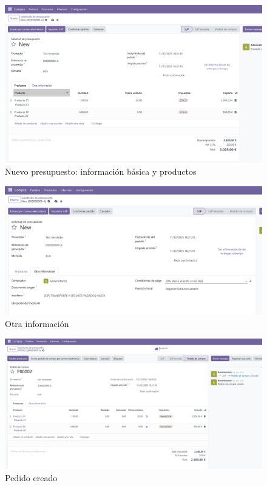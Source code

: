 \documentclass[a4paper,12pt]{article}
\begin{document}
\begin{figure}[h!]
    \centering
    \includegraphics[width=1\textwidth]{pr2odoo28-nuevoPresupuesto.png}
    \caption{Nuevo presupuesto: información básica y productos}
\end{figure}
\FloatBarrier

\begin{figure}[h!]
    \centering
    \includegraphics[width=1\textwidth]{pr2odoo29-otraInfo.png}
    \caption{Otra información}
\end{figure}
\FloatBarrier

\begin{figure}[h!]
    \centering
    \includegraphics[width=1\textwidth]{pr2odoo30-pedidoCreado.png}
    \caption{Pedido creado}
\end{figure}
\FloatBarrier
\end{document}
